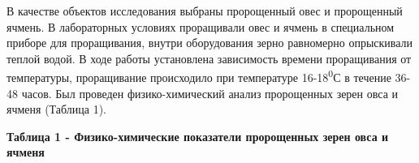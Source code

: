 В качестве объектов исследования выбраны пророщенный овес и пророщенный
ячмень. В лабораторных условиях проращивали овес и ячмень в специальном
приборе для проращивания, внутри оборудования зерно равномерно
опрыскивали теплой водой. В ходе работы установлена зависимость времени
проращивания от температуры, проращивание происходило при температуре
16-18\textsuperscript{0}С в течение 36-48 часов. Был проведен
физико-химический анализ пророщенных зерен овса и ячменя (Таблица 1).

{\bfseries Таблица 1 - Физико-химические показатели пророщенных зерен овса
и ячменя}

